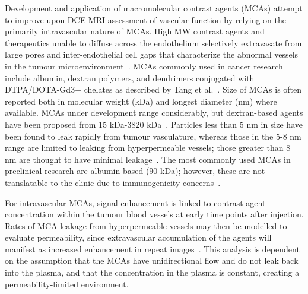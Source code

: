 Development and application of macromolecular contrast agents (\acs{MCA}s) attempt to improve upon DCE-MRI assessment of vascular function by relying on the primarily intravascular nature of \acs{MCA}s.
High \acs{MW} contrast agents and therapeutics unable to diffuse across the endothelium selectively extravasate from large pores and inter-endothelial cell gaps that characterize the abnormal vessels in the tumour microenvironment~\cite{McDonald:2002ut,Hashizume:2000bq}.
\acs{MCA}s commonly used in cancer research include albumin, dextran polymers, and dendrimers conjugated with DTPA/DOTA-Gd3+ chelates as described by Tang et al.~\cite{Tang:2013fi}.
Size of \acs{MCA}s is often reported both in molecular weight (\acs{kDa}) and longest diameter (nm) where available. 
\acs{MCA}s under development range considerably, but dextran-based agents have been proposed from 15 \acs{kDa}-3820 \acs{kDa}~\cite{Barrett:2006jx}. 
Particles less than 5 nm in size have been found to leak rapidly from tumour vasculature, whereas those in the 5-8 nm range are limited to leaking from hyperpermeable vessels; those greater than 8 nm are thought to have minimal leakage~\cite{Kobayashi:2004vq,Sato:2001tt}.
The most commonly used \acs{MCA}s in preclinical research are albumin based (90 \acs{kDa}); however, these are not translatable to the clinic due to immunogenicity concerns~\cite{Ogan:1987tg}.

For intravascular \acs{MCA}s, signal enhancement is linked to contrast agent concentration within the tumour blood vessels at early time points after injection.
Rates of \acs{MCA} leakage from hyperpermeable vessels may then be modelled to evaluate permeability, since extravascular accumulation of the agents will manifest as increased enhancement in repeat images~\cite{Ogan:1987tg,Turetschek:2004bw}.
This analysis is dependent on the assumption that the \acs{MCA}s have unidirectional flow and do not leak back into the plasma, and that the concentration in the plasma is constant, creating a permeability-limited environment.

